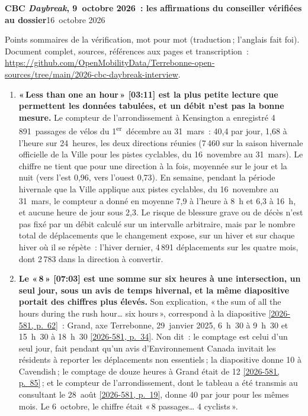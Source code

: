 \documentclass[10pt,letterpaper]{article}
\newcommand{\repourl}{https://github.com/OpenMobilityData/Terrebonne-open-sources}
\newcommand{\pagesurl}{https://openmobilitydata.github.io/Terrebonne-access-requests}
\newcommand{\cliptime}[1]{\textsf{\small[#1]}}
\newcommand{\pgl}[2]{\href{\pagesurl/2026-581/raw/01_emails_mandate_counts.pdf\#page=#1}{\textsf{\small[2026-581, p.~#2]}}}
\newcommand{\pg}[1]{\pgl{#1}{#1}}
\begin{document}
{\large\bfseries CBC \emph{Daybreak}, 9~octobre 2026~: les affirmations du conseiller vérifiées au dossier}\hfill{\small 16~octobre 2026}

\vspace{-0.2em}
{\small Points sommaires de la vérification, mot pour mot (traduction\,; l'anglais fait foi). Document complet, sources, références aux pages et transcription~:\\ \href{\repourl/tree/main/2026-cbc-daybreak-interview}{\repourl/tree/main/2026-cbc-daybreak-interview}.}
\vspace{0.4em}

\begin{enumerate}[nosep,itemsep=0.3em,leftmargin=1.4em]
  \item \begin{minipage}[t]{\linewidth}\textbf{«\,Less than one an hour\,» \cliptime{03:11} est la plus petite lecture que permettent les données tabulées, et un débit n'est pas la bonne mesure.} Le compteur de l'arrondissement à Kensington a enregistré 4\,891~passages de vélos du 1\textsuperscript{er}~décembre au 31~mars~: 40{,}4 par jour, 1{,}68 à l'heure sur 24~heures, les deux directions réunies (7\,460 sur la saison hivernale officielle de la Ville pour les pistes cyclables, du 16~novembre au 31~mars). Le chiffre ne tient que pour une direction à la fois, moyennée sur le jour et la nuit (vers l'est 0{,}96, vers l'ouest 0{,}73). En semaine, pendant la période hivernale que la Ville applique aux pistes cyclables, du 16~novembre au 31~mars, le compteur a donné en moyenne 7{,}9 à l'heure à 8~h et 6{,}3 à 16~h, et aucune heure de jour sous 2{,}3. Le risque de blessure grave ou de décès n'est pas fixé par un débit calculé sur un intervalle arbitraire, mais par le nombre total de déplacements que le changement expose, sur un hiver et sur chaque hiver où il se répète~: l'hiver dernier, 4\,891 déplacements sur les quatre mois, dont 2\,783 dans la direction à convertir.\end{minipage}\vspace{0.35em}
  \item \begin{minipage}[t]{\linewidth}\textbf{Le «\,8\,» \cliptime{07:03} est une somme sur six heures à une intersection, un seul jour, sous un avis de temps hivernal, et la même diapositive portait des chiffres plus élevés.} Son explication, «\,the sum of all the hours during the rush hour… six hours\,», correspond à la diapositive \pg{62}~: Grand, axe Terrebonne, 29~janvier 2025, 6~h~30 à 9~h~30 et 15~h~30 à 18~h~30 \pg{34}. Non dit~: le comptage est celui d'un seul jour, fait pendant qu'un avis d'Environnement Canada invitait les résidents à reporter les déplacements non essentiels\,; la diapositive donne 10 à Cavendish\,; le comptage de douze heures à Grand était de 12 \pg{85}\,; et le compteur de l'arrondissement, dont le tableau a été transmis au consultant le 28~août \pg{19}, donne 40 par jour pour les mêmes mois. Le 6~octobre, le chiffre était «\,8 passages… 4 cyclists\,».\end{minipage}\vspace{0.35em}

\end{enumerate}
\end{document}
